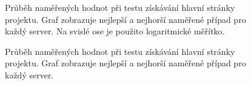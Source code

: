             \begin{figure}[h!t]
             \begin{adjustwidth}{-0.5cm}{}
                \begin{center}
                    \caption{Průběh naměřených hodnot při testu získávání hlavní stránky projektu.
                        Graf zobrazuje nejlepší a nejhorší naměřené případ pro každý server.  
                        Na svislé ose je použito logaritmické měřítko.}
                    \label{imgGetMainPageCely}
                \end{center}
             \end{adjustwidth}
            \end{figure}

            \begin{figure}[h!t]
             \begin{adjustwidth}{-0.5cm}{}
                \begin{center}
                    \caption{Průběh naměřených hodnot při testu získávání hlavní stránky projektu.
                        Graf zobrazuje nejlepší a nejhorší naměřené případ pro každý server.}
                    \label{imgGetMainPageCast}
                \end{center}
             \end{adjustwidth}
            \end{figure}


